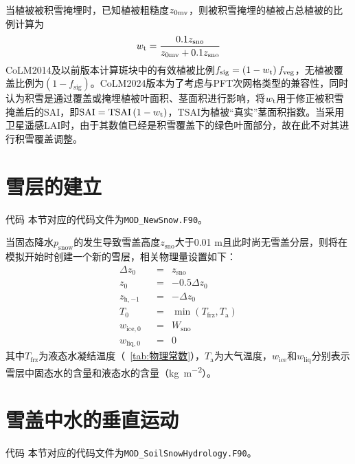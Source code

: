 当植被被积雪掩埋时，已知植被粗糙度$z_{\rm 0mv}$，则被积雪掩埋的植被占总植被的比例计算为
\begin{equation}
  w_{\rm t}=\frac{0.1 z_{\mathrm{sno}}}{z_{\rm 0mv}+0.1 z_{\mathrm{sno}}}
\end{equation}
CoLM2014及以前版本计算斑块中的有效植被比例$f_{\mathrm{sig}}=\left(1-w_{\rm t}\right)f_{\mathrm{veg}}$，无植被覆盖比例为$\left(1-f_{\mathrm{sig}}\right)$。CoLM2024版本为了考虑与PFT次网格类型的兼容性，同时认为积雪是通过覆盖或掩埋植被叶面积、茎面积进行影响，将$w_{\rm t}$用于修正被积雪掩盖后的SAI，即${\rm SAI=TSAI}\left(1-w_{\rm t}\right)$，TSAI为植被“真实”茎面积指数。当采用卫星遥感LAI时，由于其数值已经是积雪覆盖下的绿色叶面部分，故在此不对其进行积雪覆盖调整。


\section{雪层的建立}\label{sec:雪层的建立}
\begin{mymdframed}{代码}
  本节对应的代码文件为\texttt{MOD\_NewSnow.F90}。
\end{mymdframed}


当固态降水$p_{\mathrm{snow}}$的发生导致雪盖高度$z_{\mathrm{sno}}$大于0.01 m且此时尚无雪盖分层，则将在模拟开始时创建一个新的雪层，相关物理量设置如下：
\begin{equation}
  \begin{aligned}
    & \Delta z_{0} &&= &{z}_{\mathrm{sno}}& \\
    & z_0 &&= &-0.5\Delta z_0& \\
    & z_{\mathrm{h,-1}} &&= &-\Delta z_0& \\
    & T_0 &&= &\min \left(T_{\mathrm {frz}} ,T_{\mathrm{a}}\right)& \\
    & w_{\mathrm{ice,0}} &&= &W_{\mathrm{sno}}& \\
    & w_{\mathrm{liq,0}} &&= &0&
  \end{aligned}
\end{equation}
其中$T_{\mathrm {frz}} $为液态水凝结温度（~\ref{tab:物理常数}），$T_{\mathrm{a}}$为大气温度，$w_{\mathrm{ice}}$和$w_{\mathrm{liq}}$分别表示雪层中固态水的含量和液态水的含量（\unit{kg.m^{-2}}）。

\section{雪盖中水的垂直运动}\label{雪盖的水量平衡}
\begin{mymdframed}{代码}
  本节对应的代码文件为\texttt{MOD\_SoilSnowHydrology.F90}。
\end{mymdframed}

